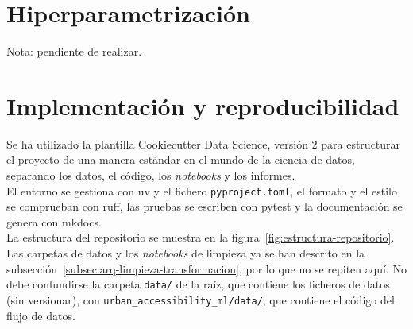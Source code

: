 \section{Hiperparametrización}
\label{sec:dis-hiperparametrizacion}

Nota: pendiente de realizar.

\section{Implementación y reproducibilidad}
\label{sec:dis-implementacion}

Se ha utilizado la plantilla Cookiecutter Data Science, versión 2 \parencite{drivendata_2024} para estructurar el proyecto de una manera estándar en el mundo de la ciencia de datos, separando los datos, el código, los \textit{notebooks} y los informes.
\\

El entorno se gestiona con uv y el fichero \texttt{pyproject.toml}, el formato y el estilo se comprueban con ruff, las pruebas se escriben con pytest y la documentación se genera con mkdocs.
\\

La estructura del repositorio se muestra en la figura~\ref{fig:estructura-repositorio}. Las carpetas de datos y los \textit{notebooks} de limpieza ya se han descrito en la subsección~\ref{subsec:arq-limpieza-transformacion}, por lo que no se repiten aquí. No debe confundirse la carpeta \texttt{data/} de la raíz, que contiene los ficheros de datos (sin versionar), con \texttt{urban\_accessibility\_ml/data/}, que contiene el código del flujo de datos.
\\

